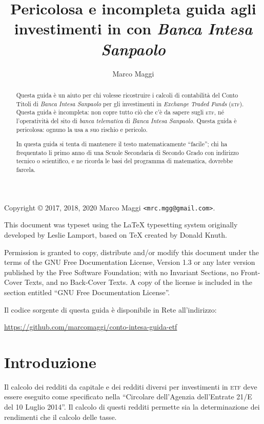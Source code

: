 \documentclass[12pt,a4paper]{article}
\author{Marco Maggi}
\title{Pericolosa e incompleta guida agli investimenti in \Etf{} con \emph{Banca Intesa Sanpaolo}}
\newcommand{\Parentesi}[1]{(#1)}
\newcommand{\Etf}[1]{\textsc{etf}}
\begin{document}
\maketitle

\begin{abstract}
  \noindent
  Questa guida è un  aiuto per chi volesse ricostruire i calcoli di  contabilità del Conto Titoli di
  \emph{Banca   Intesa   Sanpaolo}   per   gli  investimenti   in   \emph{Exchange   Traded   Funds}
  \Parentesi{\Etf{}}.   Questa guida  è incompleta:  non copre  tutto ciò  che c'è  da sapere  sugli
  \Etf{}, né  l'operatività del  sito di  \emph{banca telematica}  di \emph{Banca  Intesa Sanpaolo}.
  Questa guida è pericolosa: ognuno la usa a suo rischio e pericolo.

  In questa guida si  tenta di mantenere il testo matematicamente ``facile'';  chi ha frequentato li
  primo anno  di una Scuole Secondaria  di Secondo Grado con  indirizzo tecnico o scientifico,  e ne
  ricorda le basi del programma di matematica, dovrebbe farcela.
\end{abstract}

\tableofcontents

\newpage{}

\noindent
Copyright \copyright{} 2017, 2018, 2020 Marco Maggi \texttt{<mrc.mgg@gmail.com>}.

This  document was  typeset using  the \LaTeX{}  typesetting system  originally developed  by Leslie
Lamport, based on \TeX{} created by Donald Knuth.

Permission is  granted to copy, distribute  and/or modify this document  under the terms of  the GNU
Free  Documentation License,  Version  1.3 or  any  later  version published  by  the Free  Software
Foundation; with no  Invariant Sections, no Front-Cover  Texts, and no Back-Cover Texts.   A copy of
the license is included in the section entitled ``GNU Free Documentation License''.

Il codice sorgente di questa guida è disponibile in Rete all'indirizzo:
\begin{center}
  \url{https://github.com/marcomaggi/conto-intesa-guida-etf}
\end{center}

\newpage{}

\section{Introduzione}


Il calcolo  dei redditi da  capitale e dei  redditi diversi per  investimenti in \Etf{}  deve essere
eseguito come specificato nella ``Circolare dell'Agenzia dell'Entrate 21/E del 10 Luglio 2014''.  Il
calcolo di questi redditi permette sia la determinazione dei rendimenti che il calcolo delle tasse.
\end{document}
